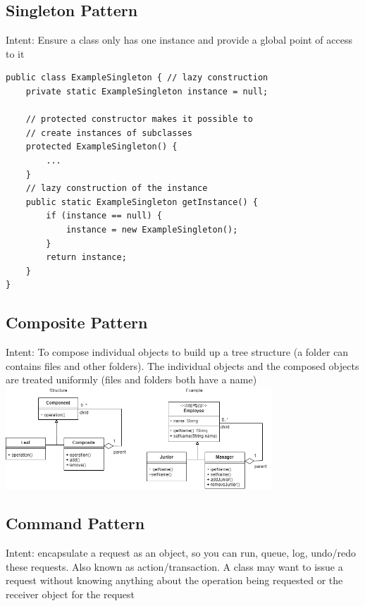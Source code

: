 \documentclass[8pt, letterpaper, titlepage]{article}
\begin{document}
\begin{multicols*}{2}
    \subsection*{Singleton Pattern}
    Intent: Ensure a class only has one instance and provide a global point of access to it
    \begin{lstlisting}
public class ExampleSingleton { // lazy construction
    private static ExampleSingleton instance = null;

    // protected constructor makes it possible to
    // create instances of subclasses
    protected ExampleSingleton() {
        ...
    }
    // lazy construction of the instance
    public static ExampleSingleton getInstance() {
        if (instance == null) {
            instance = new ExampleSingleton();
        }
        return instance;
    }
}
    \end{lstlisting}
    \subsection*{Composite Pattern}
    Intent: To compose individual objects to build up a tree structure (a folder can contains files and other folders). The individual objects and the composed objects are treated uniformly (files and folders both have a name)
    \includegraphics[width=10cm]{composite.png}

    \subsection*{Command Pattern}
    Intent: encapsulate a request as an object, so you can run, queue, log, undo/redo these requests. Also known as action/transaction. A class may want to issue a request without knowing anything about the operation being requested or the receiver object for the request

    \vfill\null
    \columnbreak


\end{multicols*}
\end{document}

